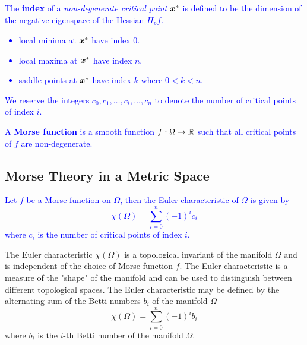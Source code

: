 \documentclass[10pt]{article}
\begin{document}
\begin{definition}
    \textcolor{blue}{
        The \textbf{index} of a \emph{non-degenerate critical point} $\bm{x}^*$ is defined to be
        the dimension of the negative eigenspace of the Hessian $H_p f$.
        \begin{itemize}
            \item local minima at $\bm{x}^*$ have index $0$.
            \item local maxima at $\bm{x}^*$ have index $n$.
            \item saddle points at $\bm{x}^*$ have index $k$ where $0 < k < n$.
        \end{itemize}
        We reserve the integers $c_0, c_1, \dots, c_i, \dots, c_n$ to denote the number of
        critical points of index $i$.
    }
\end{definition}

\begin{definition}
    \textcolor{blue}{
        A \textbf{Morse function} is a smooth function $f : \Omega \rightarrow \mathbb{R}$ such that
        all critical points of $f$ are non-degenerate.
    }
\end{definition}

\subsection{Morse Theory in a Metric Space}

\begin{theorem}
    \textcolor{Blue}{
        Let $f$ be a Morse function on $\Omega$, then the Euler characteristic of $\Omega$ is
        given by
        $$
            \chi(\Omega) = \sum_{i=0}^n (-1)^i c_i
        $$
        where $c_i$ is the number of critical points of index $i$.
    }
\end{theorem}

\begin{remark}
    The Euler characteristic $\chi(\Omega)$ is a topological invariant of the manifold $\Omega$
    and is independent of the choice of Morse function $f$.
    The Euler characteristic is a measure of the "shape" of the manifold and can be used to
    distinguish between different topological spaces.
    The Euler characteristic may be defined by the alternating sum of the Betti numbers
    $b_i$ of the manifold $\Omega$
    $$
        \chi(\Omega) = \sum_{i=0}^n (-1)^i b_i
    $$
    where $b_i$ is the $i$-th Betti number of the manifold $\Omega$.
\end{remark}
\end{document}
